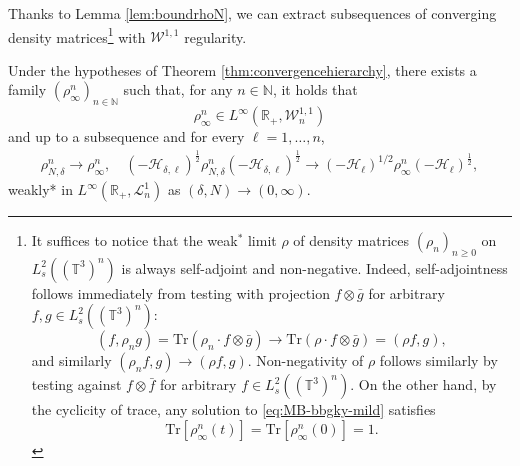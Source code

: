 Thanks to Lemma \ref{lem:boundrhoN}, we can
  extract subsequences of converging density matrices\footnote{It suffices to notice that the weak$^{\ast}$ limit $\rho$ of
  density matrices $(\rho_n)_{n \geqslant 0}$ on $L^2_s ((\mathbb{T}^3)^n)$ is
  always self-adjoint and non-negative. Indeed, self-adjointness follows
  immediately from testing with projection $f \otimes \bar{g}$ for arbitrary
  $f, g \in L^2_s ((\mathbb{T}^3)^n)$:
  \[ (f, \rho_n g) = \mathrm{Tr} (\rho_n \cdot f \otimes \bar{g}) \rightarrow
     \mathrm{Tr} (\rho \cdot f \otimes \bar{g}) = (\rho f, g), \]
  and similarly $(\rho_n f, g) \rightarrow (\rho f, g)$. Non-negativity of
  $\rho$ follows similarly by testing against $f \otimes \bar{f}$ for
  arbitrary $f \in L^2_s ((\mathbb{T}^3)^n)$. On the other hand, by the
  cyclicity of trace, any solution to \eqref{eq:MB-bbgky-mild} satisfies
  \[ \mathrm{Tr} [\rho^n_{\infty} (t)] = \mathrm{Tr} [\rho^n_{\infty} (0)] = 1.
  \]} with $\mathcal{W}^{1,
  1}$ regularity. 

\begin{lem}
  \label{lem:subsequence}Under the hypotheses of Theorem
  \ref{thm:convergencehierarchy}, there exists a family
  $(\rho^n_{\infty})_{n \in \mathbb{N}}$ such that, for any $n \in
  \mathbb{N}$, it holds that
  \[ \rho^n_{\infty} \in L^{\infty} (\mathbb{R}_+, \mathcal{W}^{1, 1}_n) \]
  and up to a subsequence and for every $\ell = 1, \ldots, n$, 
  \begin{align}\label{eq:convergence-W11L1}
  \rho^n_{N, \delta} \rightarrow \rho^n_{\infty}, \quad (-
     \mathcal{H}_{\delta, \ell})^{\frac{1}{2}} \rho^n_{N, \delta} (-
     \mathcal{H}_{\delta, \ell})^{\frac{1}{2}} \rightarrow (- \mathcal{H}_{\ell})^{1
     / 2} \rho^n_{\infty} (- \mathcal{H}_{\ell})^{\frac{1}{2}},
  \end{align}
  weakly* in $L^{\infty} (\mathbb{R}_+, \mathcal{L}^1_n)$ as $(\delta,N) \rightarrow (0,\infty)$.
\end{lem}

